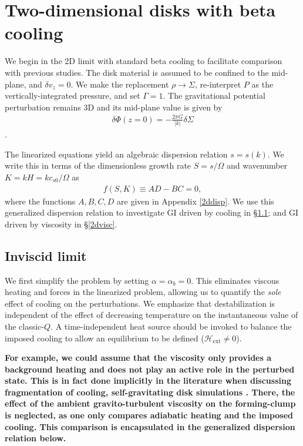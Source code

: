 \section{Two-dimensional disks with beta cooling}\label{result_2d}
We begin in the 2D limit with standard beta cooling  to facilitate comparison 
with previous studies. The disk
material is assumed to be confined to the mid-plane, and $\delta v_z=0$. 
We make the replacement  
$\rho \to \Sigma$, re-interpret $P$ as the vertically-integrated
pressure, and set $\Gamma=1$. %
The gravitational potential perturbation remains 3D and its mid-plane
value is given by    
\begin{align}
  \delta \Phi(z=0) = -\frac{2 \pi G}{|k|}\delta\Sigma
\end{align}
\citep{shu70}.
 
The linearized equations yield an algebraic dispersion relation $s =
s(k)$. We write this  
in terms of the dimensionless growth rate $S = s/\Omega$ and
wavenumber $K=kH = k c_{s0}/\Omega$ as
\begin{align}\label{thindisk}
  f(S,K)\equiv AD - BC = 0,   
\end{align}
where the functions $A,B,C,D$ are given in Appendix \ref{2ddisp}. %
We use this generalized dispersion relation  to investigate GI driven 
by cooling in \S\ref{2d_inviscid}; and GI driven by viscosity 
in \S\ref{2dvisc}. 




\subsection{Inviscid limit}\label{2d_inviscid}
We first simplify the problem by setting $\alpha = \alpha_b = 0$. This
eliminates viscous heating and forces in the linearized problem, 
allowing us to quantify the \emph{sole} effect of cooling on the 
perturbations. %
We emphasize that destabilization is independent of the effect of
decreasing temperature on the instantaneous value of the
classic-$Q$. A time-independent heat source should be invoked to
balance the imposed cooling to allow an equilibrium to be 
defined ($\mathcal{H}_\mathrm{ext}\neq 0$). 

{\bf
For example, we could assume that the viscosity only provides a
background heating and does not play an active role in the perturbed
state. This is in fact done implicitly in the literature when
discussing fragmentation of cooling, 
self-gravitating disk simulations \citep{gammie01}. 
There, the effect of the ambient 
gravito-turbulent viscosity on the forming-clump is neglected, as 
one only compares adiabatic heating and the imposed cooling.  
This comparison is encapsulated in the generalized dispersion relation
below.}

